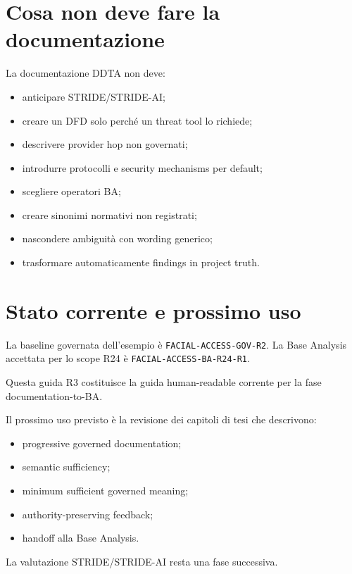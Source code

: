 \documentclass[11pt,a4paper]{article}
\newcommand{\code}[1]{\nolinkurl{#1}}
\begin{document}
\section{Cosa non deve fare la documentazione}

La documentazione DDTA non deve:

\begin{itemize}
\item anticipare STRIDE/STRIDE-AI;
\item creare un DFD solo perché un threat tool lo richiede;
\item descrivere provider hop non governati;
\item introdurre protocolli e security mechanisms per default;
\item scegliere operatori BA;
\item creare sinonimi normativi non registrati;
\item nascondere ambiguità con wording generico;
\item trasformare automaticamente findings in project truth.
\end{itemize}

\section{Stato corrente e prossimo uso}

La baseline governata dell'esempio è \code{FACIAL-ACCESS-GOV-R2}. La Base Analysis accettata per lo scope R24 è \code{FACIAL-ACCESS-BA-R24-R1}.

Questa guida R3 costituisce la guida human-readable corrente per la fase documentation-to-BA.

Il prossimo uso previsto è la revisione dei capitoli di tesi che descrivono:

\begin{itemize}
\item progressive governed documentation;
\item semantic sufficiency;
\item minimum sufficient governed meaning;
\item authority-preserving feedback;
\item handoff alla Base Analysis.
\end{itemize}

La valutazione STRIDE/STRIDE-AI resta una fase successiva.
\end{document}
